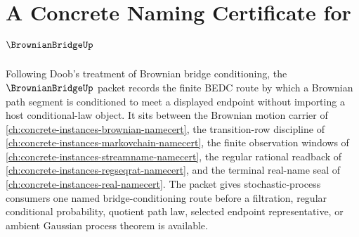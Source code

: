 \chapter{A Concrete Naming Certificate for $\BrownianBridgeUp$}
\label{ch:concrete-instances-brownian-bridge-namecert}

Following Doob's treatment of Brownian bridge conditioning, the $\BrownianBridgeUp$ packet records the finite BEDC route by which a Brownian path segment is conditioned to meet a displayed endpoint without importing a host conditional-law object. It sits between the Brownian motion carrier of \autoref{ch:concrete-instances-brownian-namecert}, the transition-row discipline of \autoref{ch:concrete-instances-markovchain-namecert}, the finite observation windows of \autoref{ch:concrete-instances-streamname-namecert}, the regular rational readback of \autoref{ch:concrete-instances-regseqrat-namecert}, and the terminal real-name seal of \autoref{ch:concrete-instances-real-namecert}. The packet gives stochastic-process consumers one named bridge-conditioning route before a filtration, regular conditional probability, quotient path law, selected endpoint representative, or ambient Gaussian process theorem is available.

